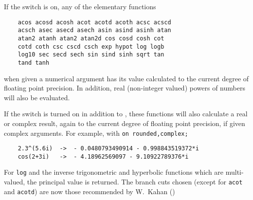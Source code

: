If the switch  is on, any of the
elementary functions
\begin{verbatim}
    acos acosd acosh acot acotd acoth acsc acscd
    acsch asec asecd asech asin asind asinh atan
    atan2 atanh atan2 atan2d cos cosd cosh cot
    cotd coth csc cscd csch exp hypot log logb
    log10 sec secd sech sin sind sinh sqrt tan
    tand tanh
\end{verbatim}
when given a numerical argument has its value calculated to the current
degree of floating point precision.  In addition, real (non-integer
valued) powers of numbers will also be evaluated.

If the  switch is turned on in addition to ,
these functions will also calculate a real or complex result, again to
the current degree of floating point precision,
if given complex arguments.  For example, with \texttt{on rounded,complex;}
\begin{verbatim}
    2.3^(5.6i)  ->  - 0.0480793490914 - 0.998843519372*i
    cos(2+3i)   ->  - 4.18962569097 - 9.10922789376*i
\end{verbatim}

For \texttt{log} and the inverse trigonometric and hyperbolic functions which are
multi-valued, the principal value is returned. The branch cuts chosen
(except for \texttt{acot} and \texttt{acotd}) are now
those recommended by W.~Kahan (\cite{Kahan1987BranchCF})


